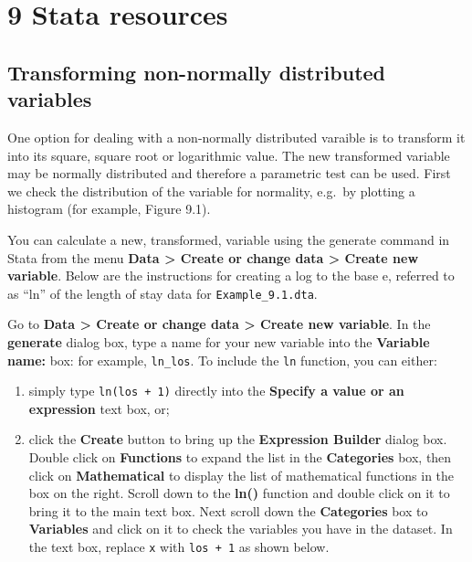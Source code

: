 \documentclass[
]{memoir}
\providecommand{\tightlist}{%
  \setlength{\itemsep}{0pt}\setlength{\parskip}{0pt}}
\begin{document}
\hypertarget{stata-resources-1}{%
\chapter*{\texorpdfstring{\textbf{9} Stata resources}{9 Stata resources}}\label{stata-resources-1}}

\hypertarget{transforming-non-normally-distributed-variables-1}{%
\section{Transforming non-normally distributed variables}\label{transforming-non-normally-distributed-variables-1}}

One option for dealing with a non-normally distributed varaible is to transform it into its square, square root or logarithmic value. The new transformed variable may be normally distributed and therefore a parametric test can be used. First we check the distribution of the variable for normality, e.g.~by plotting a histogram (for example, Figure 9.1).

You can calculate a new, transformed, variable using the generate command in Stata from the menu \textbf{Data \textgreater{} Create or change data \textgreater{} Create new variable}. Below are the instructions for creating a log to the base e, referred to as ``ln'' of the length of stay data for \texttt{Example\_9.1.dta}.

Go to \textbf{Data \textgreater{} Create or change data \textgreater{} Create new variable}. In the \textbf{generate} dialog box, type a name for your new variable into the \textbf{Variable name:} box: for example, \texttt{ln\_los}. To include the \texttt{ln} function, you can either:

\begin{enumerate}
\def\labelenumi{\arabic{enumi})}
\tightlist
\item
  simply type \texttt{ln(los\ +\ 1)} directly into the \textbf{Specify a value or an expression} text box, or;
\item
  click the \textbf{Create} button to bring up the \textbf{Expression Builder} dialog box. Double click on \textbf{Functions} to expand the list in the \textbf{Categories} box, then click on \textbf{Mathematical} to display the list of mathematical functions in the box on the right. Scroll down to the \textbf{ln()} function and double click on it to bring it to the main text box. Next scroll down the \textbf{Categories} box to \textbf{Variables} and click on it to check the variables you have in the dataset. In the text box, replace \texttt{x} with \texttt{los\ +\ 1} as shown below.
\end{enumerate}
\end{document}
